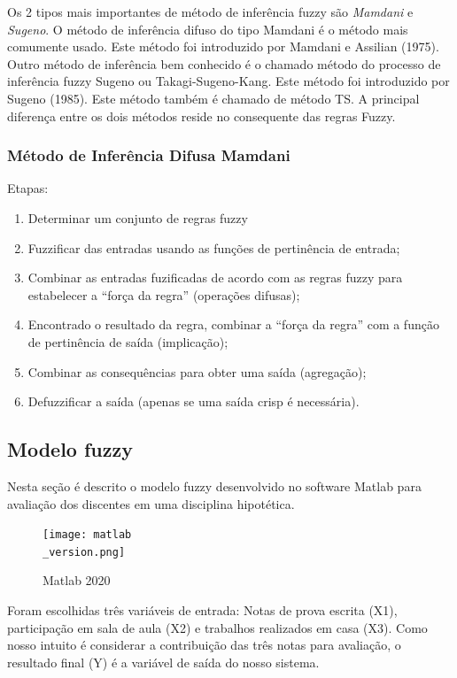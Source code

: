 \documentclass{article}
\begin{document}
Os 2 tipos mais importantes de método de inferência fuzzy são
\emph{Mamdani} e \emph{Sugeno}. O método de inferência difuso do
tipo Mamdani é o método mais comumente usado. Este método foi
introduzido por Mamdani e Assilian (1975). Outro método de
inferência bem conhecido é o chamado método do processo de
inferência fuzzy Sugeno ou Takagi-Sugeno-Kang. Este método foi
introduzido por Sugeno (1985). Este método também é chamado de
método TS. A principal diferença entre os dois métodos reside no
consequente das regras Fuzzy.

\subsubsection{Método de Inferência Difusa Mamdani\citep{
ProfVolmirWilhelm}}

Etapas:

\begin{enumerate}
    \item Determinar um conjunto de regras fuzzy
	\item Fuzzificar das entradas usando as funções de
		pertinência de entrada;
	\item Combinar as entradas fuzificadas de acordo com as
		regras fuzzy para estabelecer a ``força da regra''
		(operações difusas);
	\item Encontrado o resultado da regra, combinar a ``força
		da regra'' com a função de pertinência de saída
		(implicação);
	\item Combinar as consequências para obter uma saída
		(agregação);
	\item Defuzzificar a saída (apenas se uma saída crisp é
		necessária).
\end{enumerate}


\subsection{Modelo fuzzy}

Nesta seção é descrito o modelo fuzzy desenvolvido no software
Matlab para avaliação dos discentes em uma disciplina
hipotética.

\begin{figure}[h!]
\centering
\texttt{[image: matlab\\\_version.png]}
\caption{Matlab 2020}
\label{fig:matlab_version}
\end{figure}

Foram escolhidas três variáveis de entrada: Notas de prova
escrita (X1), participação em sala de aula (X2) e trabalhos
realizados em casa (X3). Como nosso intuito é considerar a
contribuição das três notas para avaliação, o resultado final
(Y) é a variável de saída do nosso sistema.
\end{document}
